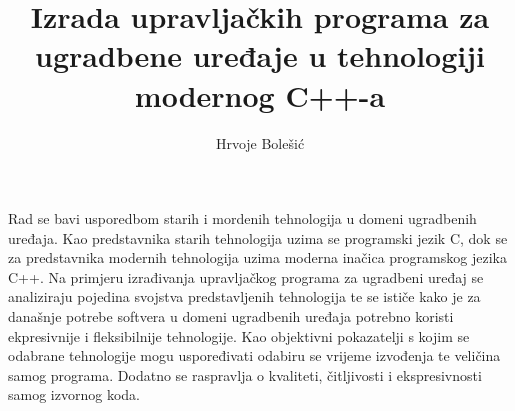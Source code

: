 \documentclass[times, utf8, diplomski]{fer}
\begin{document}

\title{Izrada upravljačkih programa za ugradbene uređaje u tehnologiji modernog C++-a}

\author{Hrvoje Bolešić}

\maketitle


\zahvala{}

\tableofcontents
















\begin{sazetak}
Rad se bavi usporedbom starih i mordenih tehnologija u domeni ugradbenih uređaja. Kao predstavnika starih tehnologija uzima se programski jezik C, dok se za predstavnika modernih tehnologija uzima moderna inačica programskog jezika C++. Na primjeru izrađivanja upravljačkog programa za ugradbeni uređaj se analiziraju pojedina svojstva predstavljenih tehnologija te se ističe kako je za današnje potrebe softvera u domeni ugradbenih uređaja potrebno koristi ekpresivnije i fleksibilnije tehnologije. Kao objektivni pokazatelji s kojim se odabrane tehnologije mogu uspoređivati odabiru se vrijeme izvođenja te veličina samog programa. Dodatno se raspravlja o kvaliteti, čitljivosti i ekspresivnosti samog izvornog koda.

\end{sazetak}
\end{document}
